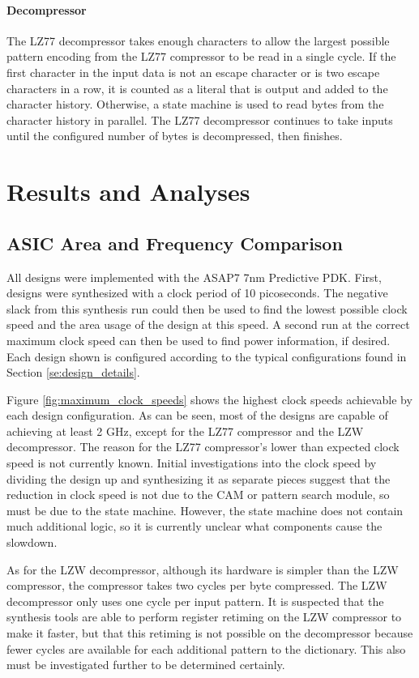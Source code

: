 \documentclass[doublespace,nopageskip]{VTthesis}
\begin{document}
\subsubsection{Decompressor}\label{sss:decompressor}
The LZ77 decompressor takes enough characters to allow the largest possible pattern encoding from the LZ77 compressor to be read in a single cycle. If the first character in the input data is not an escape character or is two escape characters in a row, it is counted as a literal that is output and added to the character history. Otherwise, a state machine is used to read bytes from the character history in parallel. The LZ77 decompressor continues to take inputs until the configured number of bytes is decompressed, then finishes.


\chapter{Results and Analyses} \label{ch:results}
\section{ASIC Area and Frequency Comparison}\label{se:asic_area_and_frequency_comparison}
All designs were implemented with the ASAP7 7nm Predictive PDK. First, designs were synthesized with a clock period of 10 picoseconds. The negative slack from this synthesis run could then be used to find the lowest possible clock speed and the area usage of the design at this speed. A second run at the correct maximum clock speed can then be used to find power information, if desired. Each design shown is configured according to the typical configurations found in Section \ref{se:design_details}.

Figure \ref{fig:maximum_clock_speeds} shows the highest clock speeds achievable by each design configuration. As can be seen, most of the designs are capable of achieving at least 2 GHz, except for the LZ77 compressor and the LZW decompressor. The reason for the LZ77 compressor's lower than expected clock speed is not currently known. Initial investigations into the clock speed by dividing the design up and synthesizing it as separate pieces suggest that the reduction in clock speed is not due to the CAM or pattern search module, so must be due to the state machine. However, the state machine does not contain much additional logic, so it is currently unclear what components cause the slowdown.

As for the LZW decompressor, although its hardware is simpler than the LZW compressor, the compressor takes two cycles per byte compressed. The LZW decompressor only uses one cycle per input pattern. It is suspected that the synthesis tools are able to perform register retiming on the LZW compressor to make it faster, but that this retiming is not possible on the decompressor because fewer cycles are available for each additional pattern to the dictionary. This also must be investigated further to be determined certainly.
\end{document}
